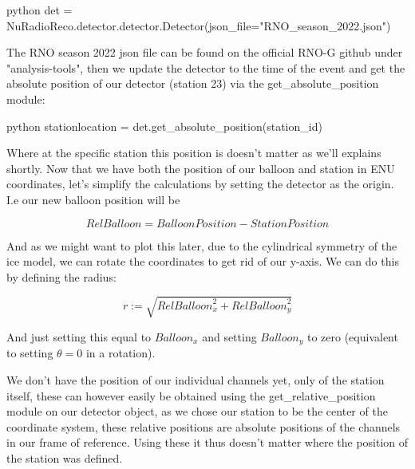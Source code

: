 \begin{mintedbox}{python}
det = NuRadioReco.detector.detector.Detector(json_file="RNO_season_2022.json")
\end{mintedbox}

The RNO season 2022 json file can be found on the official RNO-G github under
"analysis-tools", then we update the detector to the time of the event and get
the absolute position of our detector (station 23) via the
get\_absolute\_position module:

\begin{mintedbox}{python}
	stationlocation = det.get_absolute_position(station_id)
\end{mintedbox}

Where at the specific station this position is doesn't matter as we'll explains
shortly.  Now that we have both the position of our balloon and station in ENU
coordinates, let's simplify the calculations by setting the detector as the
origin.  I.e our new balloon position will be

\begin{equation}
	\textit{RelBalloon} = \textit{BalloonPosition} - \textit{StationPosition}
\end{equation}

And as we might want to plot this later, due to the cylindrical symmetry of the
ice model, we can rotate the coordinates to get rid of our y-axis. We can do
this by defining the radius:

\begin{equation}
	r := \sqrt{\textit{RelBalloon}_x^2 + \textit{RelBalloon}_y^2}
\end{equation}

And just setting this equal to $\textit{Balloon}_x$ and setting $\textit{Balloon}_y$ to
zero (equivalent to setting $\theta= 0$ in a rotation).

We don't have the position of our individual channels yet, only of the
station itself, these can however easily be obtained using the
get\_relative\_position module on our detector object, as we chose our station
to be the center of the coordinate system, these relative positions are
absolute positions of the channels in our frame of reference. Using
these it thus doesn't matter where the position of the station was defined.

